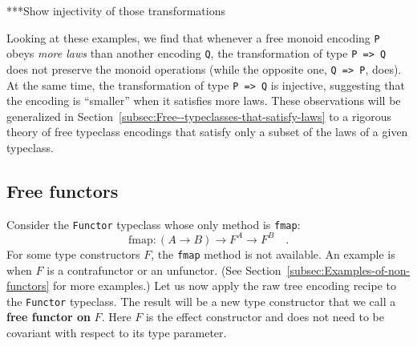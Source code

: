 {*}{*}{*}Show injectivity of those transformations

Looking at these examples, we find that whenever a free monoid encoding
\lstinline!P! obeys \emph{more
laws} than another encoding \lstinline!Q!,
the transformation of type \lstinline!P => Q!
does not preserve the monoid operations (while the opposite one, \lstinline!Q => P!,
does). At the same time, the transformation of type \lstinline!P => Q!
is injective, suggesting that the encoding is \textsf{``}smaller\textsf{''} when it
satisfies more laws. These observations will be generalized in Section~\ref{subsec:Free--typeclasses-that-satisfy-laws}
to a rigorous theory of free typeclass encodings that satisfy only
a subset of the laws of a given typeclass.

\subsection{Free functors}

Consider the \lstinline!Functor!
typeclass whose only method is \lstinline!fmap!:
\[
\text{fmap}:\left(A\rightarrow B\right)\rightarrow F^{A}\rightarrow F^{B}\quad.
\]
For some type constructors $F$, the \lstinline!fmap!
method is not available. An example is when $F$ is a contrafunctor
or an unfunctor. (See Section~\ref{subsec:Examples-of-non-functors}
for more examples.) Let us now apply the raw tree encoding recipe
to the \lstinline!Functor!
typeclass. The result will be a new type constructor that we call
a \textbf{free functor on} $F$. Here $F$ is
the effect constructor and does not need to be covariant with respect
to its type parameter.

